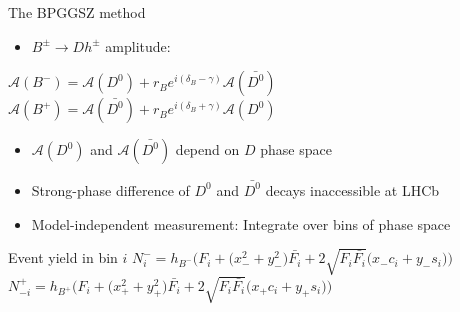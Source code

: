 \documentclass{beamer}
\begin{document}
\begin{frame}{The BPGGSZ method}
  \begin{itemize}
    \item{$B^\pm\to Dh^\pm$ amplitude:}
  \end{itemize}
  \begin{center}
    $\mathcal{A}(B^-) = \mathcal{A}(D^0) + r_Be^{i(\delta_B - \gamma)}\mathcal{A}(\bar{D^0})$ \\
    $\mathcal{A}(B^+) = \mathcal{A}(\bar{D^0}) + r_Be^{i(\delta_B + \gamma)}\mathcal{A}(D^0)$ \\
  \end{center}
  \begin{itemize}
    \item{$\mathcal{A}(D^0)$ and $\mathcal{A}(\bar{D^0})$ depend on $D$ phase space}
    \item{Strong-phase difference of $D^0$ and $\bar{D^0}$ decays inaccessible at LHCb}
    \item{Model-independent measurement: Integrate over bins of phase space}
  \end{itemize}
  \begin{block}{Event yield in bin $i$}
    $N^-_i = h_{B^-}\Big(F_i + \big(x_-^2 + y_-^2\big)\bar{F_i} + 2\sqrt{F_i\bar{F_i}}\big(x_-c_i + y_-s_i\big)\Big)$
    $N^+_{-i} = h_{B^+}\Big(F_i + \big(x_+^2 + y_+^2\big)\bar{F_i} + 2\sqrt{F_i\bar{F_i}}\big(x_+c_i + y_+s_i\big)\Big)$
  \end{block}
\end{frame}
\end{document}
